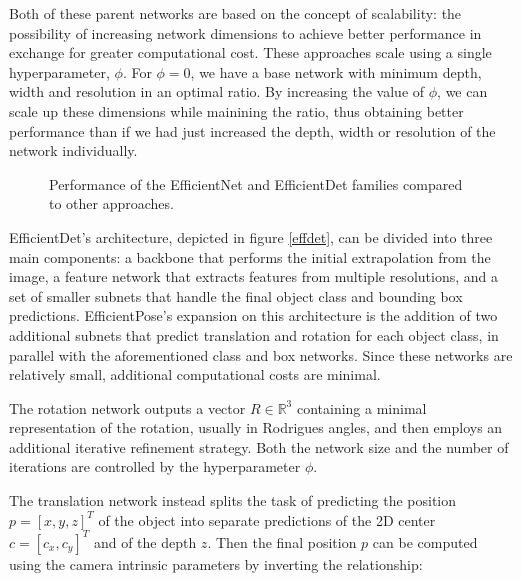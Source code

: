 Both of these parent networks are based on the concept of scalability: the possibility of increasing network dimensions to achieve better performance in exchange for greater computational cost. These approaches scale using a single hyperparameter, $\phi$. For $\phi = 0$, we have a base network with minimum depth, width and resolution in an optimal ratio. By increasing the value of $\phi$, we can scale up these dimensions while mainining the ratio, thus obtaining better performance than if we had just increased the depth, width or resolution of the network individually.

\begin{figure}[htp]
    

    \caption{Performance of the EfficientNet and EfficientDet families compared to other approaches.}
\end{figure}

EfficientDet's architecture, depicted in figure \ref{effdet}, can be divided into three main components: a backbone that performs the initial extrapolation from the image, a feature network that extracts features from multiple resolutions, and a set of smaller subnets that handle the final object class and bounding box predictions. EfficientPose's expansion on this architecture is the addition of two additional subnets that predict translation and rotation for each object class, in parallel with the aforementioned class and box networks. Since these networks are relatively small, additional computational costs are minimal.

The rotation network outputs a vector $R \in \mathbb{R}^3$ containing a minimal representation of the rotation, usually in Rodrigues angles, and then employs an additional iterative refinement strategy. Both the network size and the number of iterations are controlled by the hyperparameter $\phi$.

The translation network instead splits the task of predicting the position $p=[x, y, z]^T$ of the object into separate predictions of the 2D center $c = [c_x, c_y]^T$ and of the depth $z$. Then the final position $p$ can be computed using the camera intrinsic parameters by inverting the relationship:

